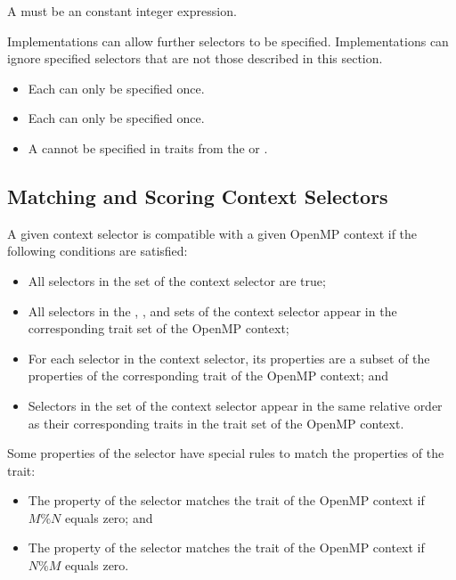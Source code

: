 A  must be an constant integer expression.

Implementations can allow further selectors to be specified. Implementations can 
ignore specified selectors that are not those described in this section.

\restrictions
\begin{itemize}
\item Each  can only be specified once.
\item Each  can only be specified once.
\item A  cannot be specified in traits from the  
      or  .
\end{itemize}



\subsection{Matching and Scoring Context Selectors}
\label{subsec:Matching and Scoring Context Selectors}

A given context selector is compatible with a given OpenMP context if the
following conditions are satisfied:

\begin{itemize}
\item All selectors in the  set of the context selector are true;
\item All selectors in the , , and  
      sets of the context selector appear in the corresponding trait set of the 
      OpenMP context;
\item For each selector in the context selector, its properties are a subset of 
      the properties of the corresponding trait of the OpenMP context; and
\item Selectors in the  set of the context selector appear 
      in the same relative order as their corresponding traits in the 
       trait set of the OpenMP context.
\end{itemize}

Some properties of the  selector have special rules to match the 
properties of the  trait:

\begin{itemize}
\item The \code{)} property of the selector matches the
       trait of the OpenMP context if $M \% N$ equals zero; and
\item The \code{)} property of the selector matches 
      the  trait of the OpenMP context if $N \% M$ equals zero.
\end{itemize}

